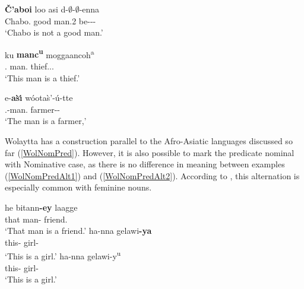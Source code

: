 
\begin{exe}\ex\label{GamNomPred}
\gll \textbf{\v{C}'aboi} lo\textglotstop o asi d-$\emptyset$-$\emptyset$-enna\\
Chabo.\nom{} good man.\acc{}2 be-\persm-\tns{}-\Neg{}\\
\glt `Chabo is not a good man.'
\end{exe}  

\begin{exe}\ex\label{KabNomPred}
\gll ku \textbf{manc\textsuperscript{u}} moggaancoh\textsuperscript{a}\\
\dist{}.\mas{} man.\nom{} thief.\acc{}.\cop{}.\mas{}\\
\glt `This man is a thief.'%
\end{exe}

\begin{exe}\ex\label{ZayNomPred}
\gll \textglotstop e-\textbf{\textglotstop a\`s{\'\i}} w\'oota\`s'-\'u-tte\\
\deter{}.\mas{}-man.\nom{} farmer-\epen{}-\cop{}\\
\glt `The man is a farmer,'
\end{exe} 

Wolaytta has a construction parallel to the Afro-Asiatic languages discussed so far (\ref{WolNomPred}). 
However, it is also possible to mark the predicate nominal with Nominative case, as there is no difference in meaning between examples (\ref{WolNomPredAlt1}) and (\ref{WolNomPredAlt2}). 
According to \citet{Lamberti:1997}, this alternation is especially common with feminine nouns.

\begin{exe}\ex{}
\begin{xlist}
\ex\label{WolNomPred}
\gll he bitann\textbf{-ey} laagge\\
that man-\nom{} friend.\acc{}\\
\glt `That man is a friend.'
\ex\label{WolNomPredAlt1}\gll ha-nna gelawi\textbf{-ya}\\
this-\fem{} girl-\nom{}\\
\glt `This is a girl.'
\ex\label{WolNomPredAlt2}\gll ha-nna gelawi-y\textsuperscript{u}\\
this-\fem{} girl-\acc{}\\
\glt `This is a girl.'
\end{xlist}
\end{exe}

